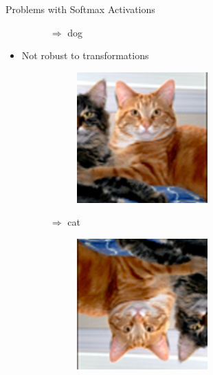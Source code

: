 \documentclass[xcolor={usenames,dvipsnames}]{beamer}
\begin{document}
\begin{frame}{Problems with Softmax Activations}
\begin{itemize}
\begin{figure}[H]
\begin{subfigure}{.1\textwidth}
			\end{subfigure} $\Rightarrow$ dog
		\end{figure}
		\pause
		\item Not robust to transformations
		\begin{figure}[H]
			\centering
			\begin{subfigure}{.1\textwidth}
				\includegraphics[width=\textwidth]{cat} 
			\end{subfigure} $\Rightarrow$ cat \hspace{.5cm}
			\begin{subfigure}{.1\textwidth}
				\includegraphics[width=\textwidth]{cat_notrobust}

\end{subfigure}
\end{figure}
\end{itemize}
\end{frame}
\end{document}
